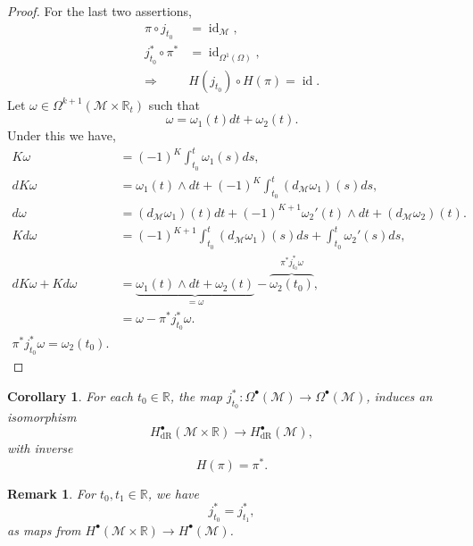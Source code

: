 \documentclass[10pt]{article}
\newtheorem{remark}{Remark}[section]
\newtheorem{corollary}{Corollary} [section]
\DeclareMathOperator{\id}{id}
\DeclareMathOperator{\dR}{dR}
\newcommand{\R}[0]{\mathbb{R}}
\newcommand{\M}[0]{\mathcal{M}}
\begin{document}
\begin{proof}
For the last two assertions,
\begin{align*}
  \pi\circ j_{t_0}&=\id_\M,\\
  j^*_{t_0}\circ\pi^*  &= \id_{\Omega^1(\Omega)},\\
  \Rightarrow & H(j_{t_0})\circ H(\pi) = \id.
\end{align*}
Let $\omega\in\Omega^{k+1}(\M\times\R_{t})$ such that 
\begin{equation*}
  \omega = \omega_1(t)dt+\omega_2(t).
\end{equation*}
Under this we have,
\begin{align*}
  K\omega &= (-1)^K\int_{t_0}^t\omega_1(s)ds,\\
  dK\omega &= \omega_1(t)\wedge dt +(-1)^K\int_{t_0}^t (d_\M\omega_1)(s)ds,\\
  d\omega & = (d_\M\omega_1)(t)dt + (-1)^{K+1}\omega_2'(t)\wedge dt+(d_\M\omega_2)(t).\\
  Kd\omega & = (-1)^{K+1}\int_{t_0}^t (d_\M \omega_1)(s)ds + \int_{t_0}^t \omega_2'(s)ds,\\
  dK\omega+Kd\omega & = \underbrace{\omega_1(t)\wedge dt+\omega_2(t)}_{=\omega}-\overbrace{\omega_2(t_0)}^{\pi^*j_{t_0}^*\omega},\\
  & = \omega-\pi^* j_{t_0}^*\omega.\\
  \pi^*j_{t_0}^*\omega = \omega_2(t_0).
\end{align*}
\end{proof}

\begin{corollary}
  For each $t_0\in\R$, the map $j_{t_0}^*:\Omega^\bullet(\M)\to\Omega^\bullet(\M)$, induces an isomorphism 
  \begin{equation*}
    H_{\dR}^\bullet(\M\times\R)\to H_{\dR}^\bullet(\M),
  \end{equation*}
  with inverse  
  \begin{equation*}
    H(\pi) = \pi^*.
  \end{equation*}
\end{corollary}

\begin{remark}
  For $t_0,t_1\in\R$, we have 
  \begin{equation*}
    j_{t_0}^*=j_{t_1}^*,
  \end{equation*}
  as maps from $H^\bullet(\M\times\R)\to H^\bullet(\M)$.
\end{remark}
\end{document}
